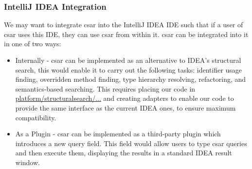 \documentclass[12pt, letterpaper]{article}
\begin{document}
\subsubsection{IntelliJ IDEA Integration}
We may want to integrate csar into the IntelliJ IDEA IDE such that if a user of csar uses this IDE, they can use csar from within it. 
csar can be integrated into it in one of two ways:
\begin{itemize}
  \item Internally - csar can be implemented as an alternative to IDEA's structural search,
  this would enable it to carry out the following tasks:
  identifier usage finding, overridden method finding, type hierarchy resolving, refactoring, and semantics-based searching.
  This requires placing our code in \href{https://github.com/JetBrains/intellij-community/tree/master/platform/structuralsearch/source/com/intellij/structuralsearch}{platform/structuralsearch/...} and creating adapters to enable our code to provide the same interface as the current IDEA ones, to ensure maximum compatibility.
  \item As a Plugin - csar can be implemented as a third-party plugin which introduces a new query field.
  This field would allow users to type csar queries and then execute them, displaying the results in a standard IDEA result window.
\end{itemize}
\end{document}
